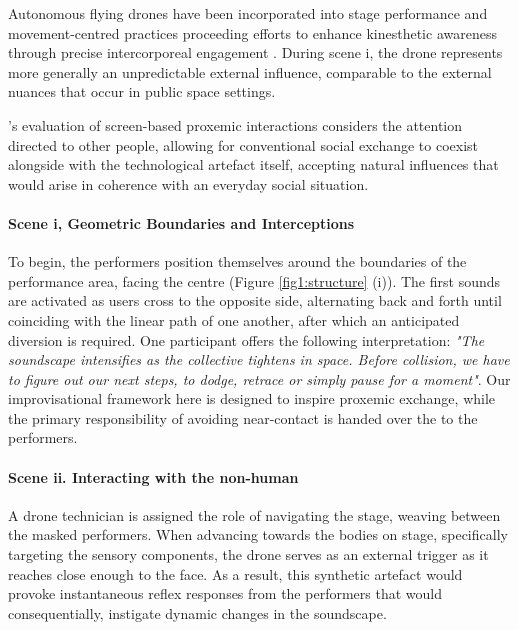 Autonomous flying drones have been incorporated into stage performance \citep{eriksson_dancing_2019} and movement-centred practices \citep{la_delfa_drone_2020} proceeding efforts to enhance kinesthetic awareness through precise intercorporeal engagement \citep{tezza_state---art_2019}. During scene i, the drone represents more generally an unpredictable external influence, comparable to the external nuances that occur in public space settings.

\citeauthor{ballendat_proxemic_2010}'s \citeyear{ballendat_proxemic_2010} evaluation of screen-based proxemic interactions considers the attention directed to other people, allowing for conventional social exchange to coexist alongside with the technological artefact itself, accepting natural influences that would arise in coherence with an everyday social situation.

\paragraph{Scene i, Geometric Boundaries and Interceptions}

To begin, the performers position themselves around the boundaries of the performance area, facing the centre (Figure \ref{fig1:structure} (i)). The first sounds are activated as users cross to the opposite side, alternating back and forth until coinciding with the linear path of one another, after which an anticipated diversion is required. One participant offers the following interpretation: \textit{"The soundscape intensifies as the collective tightens in space. Before collision, we have to figure out our next steps, to dodge, retrace or simply pause for a moment"}. Our improvisational framework here is designed to inspire proxemic exchange, while the primary responsibility of avoiding near-contact is handed over the to the performers.

\paragraph{Scene ii. Interacting with the non-human}

A drone technician is assigned the role of navigating the stage, weaving between the masked performers. When advancing towards the bodies on stage, specifically targeting the sensory components, the drone serves as an external trigger as it reaches close enough to the face. As a result, this synthetic artefact would provoke instantaneous reflex responses from the performers that would consequentially, instigate dynamic changes in the soundscape.

